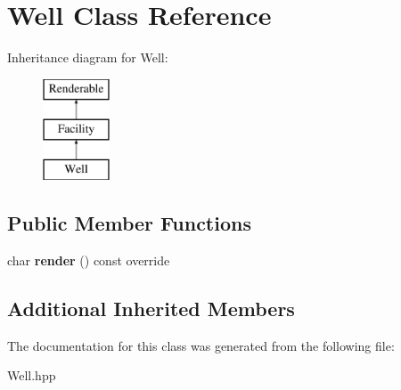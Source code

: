 \hypertarget{class_well}{}\section{Well Class Reference}
\label{class_well}
Inheritance diagram for Well\+:\begin{figure}[H]
\begin{center}
\leavevmode
\includegraphics[height=3.000000cm]{class_well}
\end{center}
\end{figure}
\subsection*{Public Member Functions}
\begin{DoxyCompactItemize}
\item 
\mbox{\label{class_well_a6a01858d1851a60b7ebac20b2c8a295f}} 
char {\bfseries render} () const override
\end{DoxyCompactItemize}
\subsection*{Additional Inherited Members}


The documentation for this class was generated from the following file\+:\begin{DoxyCompactItemize}
\item 
Well.\+hpp\end{DoxyCompactItemize}
